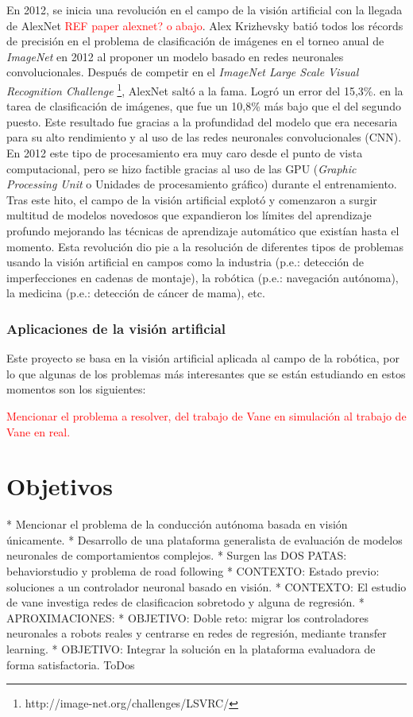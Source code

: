 En 2012, se inicia una revolución en el campo de la visión artificial con la llegada de AlexNet \textcolor{red}{REF paper alexnet? o abajo}. Alex Krizhevsky batió todos los récords de precisión en el problema de clasificación de imágenes en el torneo anual de \textit{ImageNet} en 2012 al proponer un modelo basado en redes neuronales convolucionales. Después de competir en el \textit{ImageNet Large Scale Visual Recognition Challenge} \footnote{http://image-net.org/challenges/LSVRC/}, AlexNet saltó a la fama. Logró un error del 15,3\%. en la tarea de clasificación de imágenes, que fue un 10,8\% más bajo que el del segundo puesto. Este resultado fue gracias a la profundidad del modelo que era necesaria para su alto rendimiento y al uso de las redes neuronales convolucionales (CNN). En 2012 este tipo de procesamiento era muy caro desde el punto de vista computacional, pero se hizo factible gracias al uso de las GPU (\textit{Graphic Processing Unit} o Unidades de procesamiento gráfico) durante el entrenamiento.
Tras este hito, el campo de la visión artificial explotó y comenzaron a surgir multitud de modelos novedosos que expandieron los límites del aprendizaje profundo mejorando las técnicas de aprendizaje automático que existían hasta el momento. Esta revolución dio pie a la resolución de diferentes tipos de problemas usando la visión artificial en campos como la industria (p.e.: detección de imperfecciones en cadenas de montaje), la robótica (p.e.: navegación autónoma), la medicina (p.e.: detección de cáncer de mama), etc.

\subsubsection{Aplicaciones de la visión artificial}

Este proyecto se basa en la visión artificial aplicada al campo de la robótica, por lo que algunas de los problemas más interesantes que se están estudiando en estos momentos son los siguientes:

\textcolor{red}{Mencionar el problema a resolver, del trabajo de Vane en simulación al trabajo de Vane en real.}


\section{Objetivos}

* Mencionar el problema de la conducción autónoma basada en visión únicamente.
* Desarrollo de una plataforma generalista de evaluación de modelos neuronales de comportamientos complejos.
* Surgen las DOS PATAS: behaviorstudio y problema de road following
* CONTEXTO: Estado previo: soluciones a un controlador neuronal basado en visión. 
* CONTEXTO: El estudio de vane investiga redes de clasificacion sobretodo y alguna de regresión. 
* APROXIMACIONES: 
* OBJETIVO: Doble reto: migrar los controladores neuronales a robots reales y centrarse en redes de regresión, mediante transfer learning.
* OBJETIVO: Integrar la solución en la plataforma evaluadora de forma satisfactoria. ToDos


